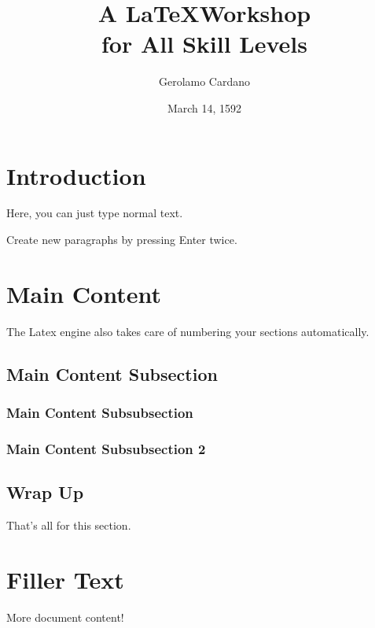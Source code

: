 \documentclass[11pt,twoside,a4paper]{article}
\author{Gerolamo Cardano}
\date{March 14, 1592}
\title{A \LaTeX Workshop \\ for All Skill Levels}
\begin{document}
\maketitle

\section{Introduction}
Here, you can just type normal text.

Create new paragraphs by pressing Enter twice.

\section{Main Content}
The Latex engine also takes care of numbering your sections automatically. 

    \subsection{Main Content Subsection}

        \subsubsection{Main Content Subsubsection}

        \subsubsection{Main Content Subsubsection 2}
        
    \subsection{Wrap Up}
    That's all for this section.


\section{Filler Text}
More document content!
\end{document}
